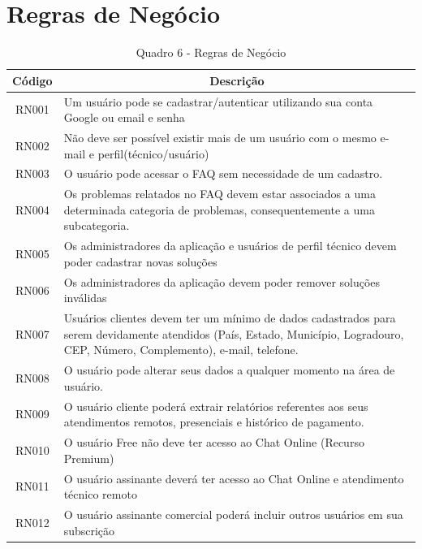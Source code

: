 \section{Regras de Negócio}

\begin{table}[htb]
    \centering
    \caption{Quadro 6 - Regras de Negócio}
    \begin{tabular}{|c|p{14cm}|}
        \hline
        Código & \multicolumn{1}{c|}{Descrição} \\ \hline
        RN001 & Um usuário pode se cadastrar/autenticar utilizando sua conta Google ou email e senha \\ \hline
        RN002 & Não deve ser possível existir mais de um usuário com o mesmo e-mail e perfil(técnico/usuário) \\ \hline
        RN003 & O usuário pode acessar o FAQ sem necessidade de um cadastro. \\ \hline
        RN004 & Os problemas relatados no FAQ devem estar associados a uma determinada categoria de problemas, consequentemente a uma subcategoria. \\ \hline
        RN005 & Os administradores da aplicação e usuários de perfil técnico devem poder cadastrar novas soluções \\ \hline
        RN006 & Os administradores da aplicação devem poder remover soluções inválidas \\ \hline
        RN007 & Usuários clientes devem ter um mínimo de dados cadastrados para serem devidamente atendidos (País, Estado, Município, Logradouro, CEP, Número, Complemento), e-mail, telefone. \\ \hline
        RN008 & O usuário pode alterar seus dados a qualquer momento na área de usuário. \\ \hline
        RN009 & O usuário cliente poderá extrair relatórios referentes aos seus atendimentos remotos, presenciais e histórico de pagamento. \\ \hline
        RN010 & O usuário Free não deve ter acesso ao Chat Online (Recurso Premium) \\ \hline
        RN011 & O usuário assinante deverá ter acesso ao Chat Online e atendimento técnico remoto \\ \hline
        RN012 & O usuário assinante comercial poderá incluir outros usuários em sua subscrição \\ \hline

\end{tabular}
\end{table}
